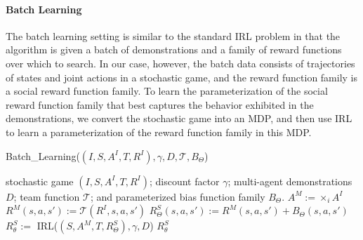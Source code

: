 
\paragraph{Batch Learning}
\label{sec:batch}

The batch learning setting is similar to the standard IRL problem in
that the algorithm is given a batch of demonstrations and a family of
reward functions over which to search. In our case, however, the batch
data consists of trajectories of states and joint actions in a
stochastic game, and the reward function family is a social reward
function family.  To learn the parameterization of the social reward
function family that best captures the behavior exhibited in the
demonstrations, we convert the stochastic game into an MDP,
and then use IRL to learn a parameterization of the reward function
family in this MDP.

\begin{algorithm}[t]
\caption{Batch\_Learning($(I,S,A^I,T,R^I), \gamma, D, {\mathcal T}, B_\Theta$)}
\label{alg:srl}
\begin{algorithmic}
\Require stochastic game $(I,S,A^I,T,R^I)$; discount factor $\gamma$; multi-agent demonstrations $D$; team function ${\mathcal T}$; and parameterized bias function family $B_\Theta$.
\State $A^M := \times_i A^I$ 
\State $R^M(s, a, s') := {\mathcal T}(R^I, s, a, s')$ 
\State $R^S_\Theta(s, a, s') := R^M(s, a, s') + B_\Theta(s, a, s')$ 
\State $R^S_\theta :=$ IRL($(S,A^M,T,R^S_\Theta), \gamma, D$)
\State \Return $R^S_\theta$ 
\end{algorithmic}
\end{algorithm}

